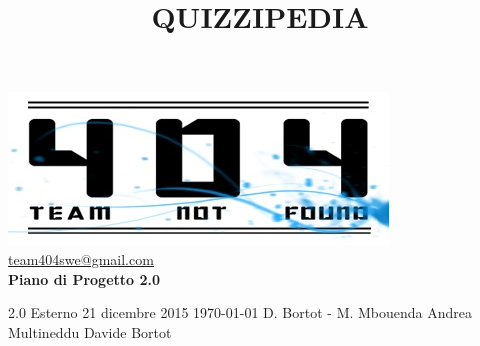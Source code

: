 \documentclass[a4paper,11pt]{article}
\title{\textbf{{\fontsize{10mm}{6mm}\selectfont QUIZZIPEDIA}}}
\begin{document}
	\maketitle
	
	\begin{center}

	\includegraphics{../../team_not_found.jpg}\\	
	\fontsize{5mm}{3mm}\url{team404swe@gmail.com}\\
	\vspace{40mm}
	\textbf{ Piano di Progetto 2.0}
	\end{center}
	\thispagestyle{empty}	%
			{2.0} 							%
			{Esterno} 						%
			{21 dicembre 2015} 				%
			{\today} 						%
			{D. Bortot - M. Mbouenda}		%
			{Andrea Multineddu} 			%
			{Davide Bortot} 				%
	
	\newpage
	\thispagestyle{empty}
	\null
	
	\newpage
	\fancyfoot[R]{\thepage}
\end{document}
